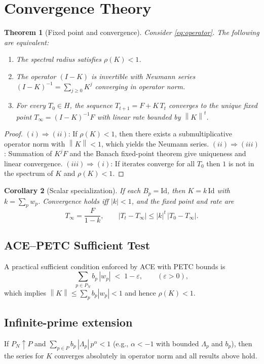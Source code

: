 \documentclass[11pt]{article}
\theoremstyle{plain}
\newtheorem{theorem}{Theorem}
\newtheorem{corollary}[theorem]{Corollary}
\theoremstyle{definition}
\theoremstyle{remark}
\newcommand{\norm}[1]{\left\lVert #1 \right\rVert}
\newcommand{\Id}{\mathrm{Id}}
\begin{document}
\section{Convergence Theory}
\begin{theorem}[Fixed point and convergence]
Consider \eqref{eq:operator}. The following are equivalent:
\begin{enumerate}[label=(\roman*),leftmargin=*]
  \item The spectral radius satisfies $\rho(K)<1$.
  \item The operator $(I-K)$ is invertible with Neumann series $(I-K)^{-1}=\sum_{j\ge 0} K^j$ converging in operator norm.
  \item For every $T_0\in H$, the sequence $T_{t+1}=F+K\,T_t$ converges to the unique fixed point $T_\infty=(I-K)^{-1}F$ with linear rate bounded by $\norm{K}^t$.
\end{enumerate}
\end{theorem}
\begin{proof}
$(i)\Rightarrow(ii)$: If $\rho(K)<1$, then there exists a submultiplicative operator norm with $\norm{K}<1$, which yields the Neumann series. $(ii)\Rightarrow(iii)$: Summation of $K^jF$ and the Banach fixed-point theorem give uniqueness and linear convergence. $(iii)\Rightarrow(i)$: If iterates converge for all $T_0$ then $1$ is not in the spectrum of $K$ and $\rho(K)<1$.
\end{proof}

\begin{corollary}[Scalar specialization]
If each $B_p=\Id$, then $K=k\,\Id$ with $k=\sum_p w_p$. Convergence holds iff $|k|<1$, and the fixed point and rate are
\[
  T_\infty = \frac{F}{1-k}, \qquad |T_t-T_\infty| \le |k|^t\,|T_0-T_\infty|.
\]
\end{corollary}

\subsection{ACE--PETC Sufficient Test}
A practical sufficient condition enforced by ACE with PETC bounds is
\begin{equation}
  \sum_{p\in P_N} b_p\,|w_p|\; <\; 1-\varepsilon, \qquad (\varepsilon>0),
  \label{eq:ace-budget}
\end{equation}
which implies $\norm{K}\le \sum_p b_p|w_p| < 1$ and hence $\rho(K)<1$.

\subsection{Infinite-prime extension}
If $P_N\uparrow P$ and $\sum_{p\in P} b_p\,|\Lambda_p|\,p^{\alpha} < 1$ (e.g., $\alpha<-1$ with bounded $\Lambda_p$ and $b_p$), then the series for $K$ converges absolutely in operator norm and all results above hold.
\end{document}
